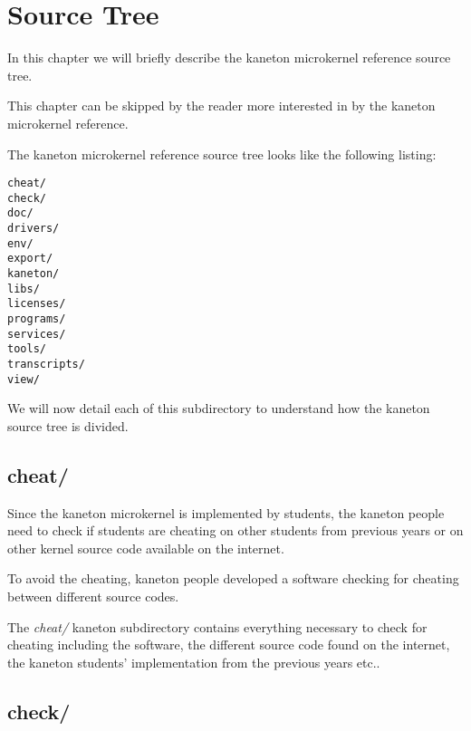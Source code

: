 
%
%

\chapter{Source Tree}

In this chapter we will briefly describe the kaneton microkernel reference
source tree.

This chapter can be skipped by the reader more interested in by the
kaneton microkernel reference.

\newpage

%
%

The kaneton microkernel reference source tree looks like the following
listing:

\begin{verbatim}
cheat/
check/
doc/
drivers/
env/
export/
kaneton/
libs/
licenses/
programs/
services/
tools/
transcripts/
view/
\end{verbatim}

We will now detail each of this subdirectory to understand how the
kaneton source tree is divided.

%
%

\section{cheat/}

Since the kaneton microkernel is implemented by students, the kaneton
people need to check if students are cheating on other students from
previous years or on other kernel source code available on the internet.

To avoid the cheating, kaneton people developed a software checking
for cheating between different source codes.

The \textit{cheat/} kaneton subdirectory contains everything necessary
to check for cheating including the software, the different source code
found on the internet, the kaneton students' implementation from the
previous years etc..

%
%

\section{check/}

